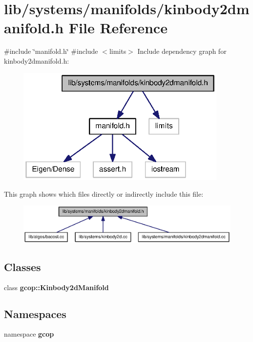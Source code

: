 \section{lib/systems/manifolds/kinbody2dmanifold.h \-File \-Reference}
\label{kinbody2dmanifold_8h}
{\ttfamily \#include \char`\"{}manifold.\-h\char`\"{}}\*
{\ttfamily \#include $<$limits$>$}\*
\-Include dependency graph for kinbody2dmanifold.\-h\-:
\nopagebreak
\begin{figure}[H]
\begin{center}
\leavevmode
\includegraphics[width=296pt]{kinbody2dmanifold_8h__incl}
\end{center}
\end{figure}
\-This graph shows which files directly or indirectly include this file\-:
\nopagebreak
\begin{figure}[H]
\begin{center}
\leavevmode
\includegraphics[width=350pt]{kinbody2dmanifold_8h__dep__incl}
\end{center}
\end{figure}
\subsection*{\-Classes}
\begin{DoxyCompactItemize}
\item 
class {\bf gcop\-::\-Kinbody2d\-Manifold}
\end{DoxyCompactItemize}
\subsection*{\-Namespaces}
\begin{DoxyCompactItemize}
\item 
namespace {\bf gcop}
\end{DoxyCompactItemize}
